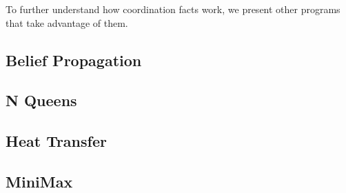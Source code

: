 To further understand how coordination facts work, we present other programs that
take advantage of them.

\subsection{Belief Propagation}\label{sec:coordination:bp}


\subsection{N Queens}\label{section:coord:nqueens}


\subsection{Heat Transfer}\label{section:coord:ht}
\subsection{MiniMax}\label{section:coord:minimax}


